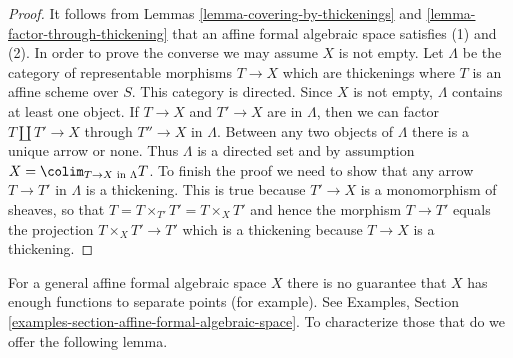 \begin{proof}
It follows from Lemmas \ref{lemma-covering-by-thickenings} and
\ref{lemma-factor-through-thickening} that an affine formal algebraic space
satisfies (1) and (2). In order to prove the converse we may
assume $X$ is not empty.
Let $\Lambda$ be the category of representable morphisms $T \to X$ which are
thickenings where $T$ is an affine scheme over $S$. This category
is directed. Since $X$ is not empty, $\Lambda$ contains at least one
object. If $T \to X$ and $T' \to X$ are in $\Lambda$, then we can
factor $T \amalg T' \to X$ through $T'' \to X$ in $\Lambda$. Between
any two objects of $\Lambda$ there is a unique arrow or none. Thus
$\Lambda$ is a directed set and by assumption
$X = \colim_{T \to X\text{ in }\Lambda} T$. To finish the proof
we need to show that any arrow $T \to T'$ in $\Lambda$ is a thickening.
This is true because $T' \to X$ is a monomorphism of sheaves, so that
$T = T \times_{T'} T' = T \times_X T'$ and hence the morphism
$T \to T'$ equals the projection $T \times_X T' \to T'$ which is
a thickening because $T \to X$ is a thickening.
\end{proof}

\noindent
For a general affine formal algebraic space $X$ there is no guarantee
that $X$ has enough functions to separate points (for example).
See Examples, Section \ref{examples-section-affine-formal-algebraic-space}.
To characterize those that do we offer the following lemma.

